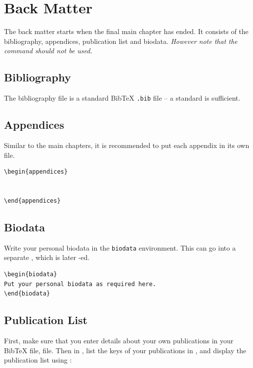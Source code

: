 \documentclass[a4paper,nofonts,raggedright,titlepage,openany]{tufte-book}
\begin{document}
\section{Back Matter}

The back matter starts when the final main chapter has ended. It consists of the bibliography, appendices, publication list and  biodata. \emph{However note that the \texttt{\backmatter} command \emph{should not} be used.}

\subsection{Bibliography}

The bibliography file is a standard Bib\TeX{} \texttt{.bib} file -- a standard \texttt{} is sufficient.

\subsection{Appendices}

Similar to the main chapters, it is recommended to put each appendix in its own file.

\begin{verbatim}
\begin{appendices}


\end{appendices}
\end{verbatim}

\subsection{Biodata}
Write your personal biodata in the \texttt{biodata} environment. This can go into a separate , which is later \texttt{}-ed.

\begin{verbatim}
\begin{biodata}
Put your personal biodata as required here.
\end{biodata}
\end{verbatim}

\subsection{Publication List}

First, make sure that you enter details about your own publications in your Bib\TeX{} file,  file.
Then in , list the keys of your publications in \texttt{}, and display the publication list using \texttt{\bibliographyown}:
\end{document}
